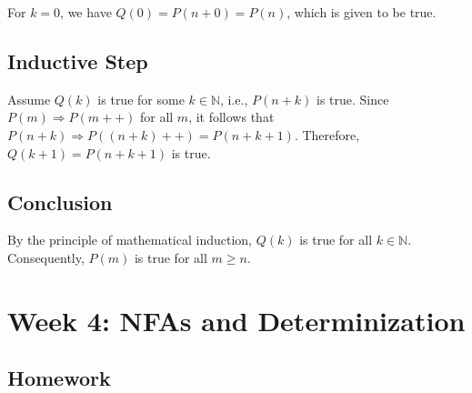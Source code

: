 \documentclass[11pt]{article}
\begin{document}
\begin{itemize}[leftmargin=*]
For \( k = 0 \), we have \( Q(0) = P(n + 0) = P(n) \), which is given to be true.

\subsection*{Inductive Step}

Assume \( Q(k) \) is true for some \( k \in \mathbb{N} \), i.e., \( P(n + k) \) is true. Since \( P(m) \Rightarrow P(m++) \) for all \( m \), it follows that \( P(n + k) \Rightarrow P((n + k)++) = P(n + k + 1) \). Therefore, \( Q(k + 1) = P(n + k + 1) \) is true.

\subsection*{Conclusion}

By the principle of mathematical induction, \( Q(k) \) is true for all \( k \in \mathbb{N} \). Consequently, \( P(m) \) is true for all \( m \geq n \).

\end{itemize}

\section{Week 4: NFAs and Determinization}

\subsection{Homework}
\end{document}
